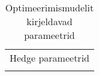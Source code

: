 \begin{landscape}
\begin{longtable}{l l l l}
\\ \multicolumn{4}{c}{Hedge parameetrid} \\
   
\caption{Optimeerimismudelit kirjeldavad parameetrid \label{tab:para}} 
\end{longtable}
\end{landscape}
